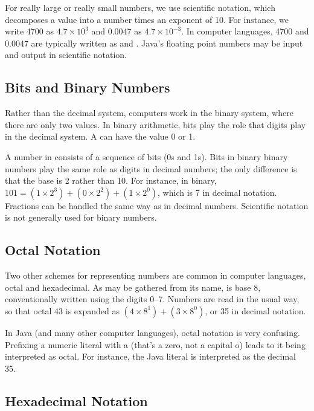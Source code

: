 For really large or really small numbers, we use scientific notation,
which decomposes a value into a number times an exponent of 10.  For
instance, we write 4700 as $4.7 \times 10^3$ and 0.0047 as $4.7 \times
10^{-3}$.  In computer languages, 4700 and 0.0047 are typically
written as  and .  Java's floating point
numbers may be input and output in scientific notation.

\subsection{Bits and Binary Numbers}

Rather than the decimal system, computers work in the binary system,
where there are only two values.  In binary arithmetic, bits play the
role that digits play in the decimal system.  A  can have
the value 0 or 1.  

A number in  consists of a sequence
of bits (0s and 1s).  Bits in binary binary numbers play the same role
as digits in decimal numbers; the only difference is that the base is
2 rather than 10.  For instance, in binary, $101 = (1 \times 2^3) + (0
\times 2^2) + (1 \times 2^0)$, which is 7 in decimal notation.  Fractions
can be handled the same way as in decimal numbers.  Scientific notation
is not generally used for binary numbers.

\subsection{Octal Notation}

Two other schemes for representing numbers are common in computer
languages, octal and hexadecimal.  As may be gathered from its name,
 is base 8, conventionally written using the
digits 0--7.  Numbers are read in the usual way, so that octal 43 is
expanded as $(4 \times 8^1) + (3 \times 8^0)$, or 35 in decimal
notation.

In Java (and many other computer languages), octal
notation is very confusing.  Prefixing a numeric
literal with a  (that's a zero, not a capital o) leads to it
being interpreted as octal.  For instance, the Java literal 
is interpreted as the decimal 35.

\subsection{Hexadecimal Notation}

